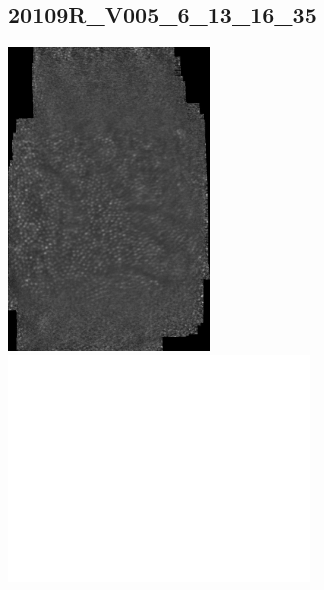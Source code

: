 \documentclass[11pt]{article}
\begin{document}
\subsection{20109R\_V005\_6\_13\_16\_35}
\includegraphics[width=0.40\textwidth, valign=m]{referenceframes/aoslo/20109R_V005_6_13_16_35_dwt_nostim_gamscaled_bandfilt_refframe.jpg}
\includegraphics[width=0.60\textwidth, valign=m]{eyepositiontraces/aoslo/20109R_V005_6_13_16_35.jpg}\\
\end{document}
